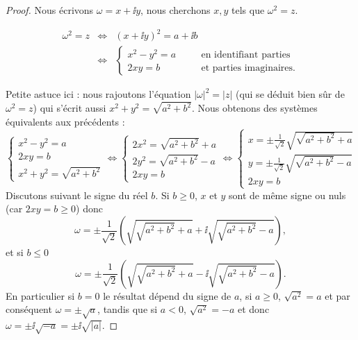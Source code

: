 \documentclass[class=report,crop=false]{standalone}
\begin{document}
\begin{proof}
Nous écrivons $\omega= x + \ii y$, nous cherchons $x,y$ tels que $\omega^2=z$.

\begin{eqnarray*}
  \omega^2 = z & \Longleftrightarrow & \left( x + \ii y \right)^2 = a + \ii b\\
  & \Longleftrightarrow & \left\{ \begin{array}{lcc}
    x^2 - y^2 = a&\quad&\text{en identifiant parties}\\
    2 xy = b     &\quad&\text{et parties imaginaires.}
  \end{array} \right.
\end{eqnarray*}

Petite astuce ici : nous rajoutons l'équation $\left| \omega \right|^2 = \left| z \right|$ (qui se
déduit bien sûr de $\omega^2=z$) qui s'écrit aussi $x^2+y^2 = \sqrt{a^2+b^2}$.
Nous obtenons des systèmes équivalents aux précédents :
{\small
\[ \left\{ \begin{array}{l}
     x^2 - y^2 = a\\
     2 xy = b\\
     x^2 + y^2 = \sqrt{a^2 + b^2}
   \end{array} \right. \Longleftrightarrow \left\{ \begin{array}{l}
     2 x^2 = \sqrt{a^2 + b^2} + a\\
     2 y^2 = \sqrt{a^2 + b^2} - a\\
     2 xy = b
   \end{array} \right. \Longleftrightarrow \left\{ \begin{array}{l}
     x = \pm \frac{1}{\sqrt{2}}  \sqrt{\sqrt{a^2 + b^2} + a}\\
     y = \pm \frac{1}{\sqrt{2}}  \sqrt{\sqrt{a^2 + b^2} - a}\\
     2 xy = b
   \end{array} \right. \]
   }
Discutons suivant le signe du r\'eel $b$. Si $b \geqslant 0$, $x$ et $y$ sont de
m\^eme signe ou nuls (car $2xy=b \ge 0$) donc
\[ \omega = \pm \frac{1}{\sqrt{2}}  \left( \sqrt{\sqrt{a^2 + b^2} + a} + \ii
   \sqrt{\sqrt{a^2 + b^2} - a} \right), \]
et si $b \leqslant 0$
\[ \omega = \pm \frac{1}{\sqrt{2}}  \left( \sqrt{\sqrt{a^2 + b^2} + a} - \ii
   \sqrt{\sqrt{a^2 + b^2} - a} \right). \]
En particulier si $b = 0$ le résultat dépend du signe de $a$, si $a
\geqslant 0$, $\sqrt{a^2} = a$ et par conséquent $\omega = \pm \sqrt{a}$,
tandis que si $a < 0$, $\sqrt{a^2} = - a$ et donc $\omega = \pm \ii  \sqrt{- a} =
\pm \ii  \sqrt{\left| a \right|}$.
\end{proof}
\end{document}
